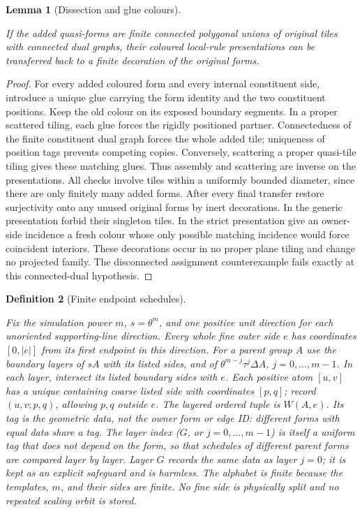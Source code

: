 \documentclass[11pt,a4paper]{article}
\newtheorem{definition}{Definition}[section]
\newtheorem{lemma}[definition]{Lemma}
\theoremstyle{remark}
\newcommand{\lean}[1]{}
\newcommand{\uses}[1]{}
\begin{document}
\begin{lemma}[Dissection and glue colours]\label{lem:glues}
\lean{Tilings.Decoration.dissection_preserves_sofic,Tilings.Planned.Strict.exists_coincident_side}
\uses{def:certificate,def:localrule}
If the added quasi-forms are finite connected polygonal unions of original
tiles with connected dual graphs, their coloured local-rule presentations
can be transferred back to a finite decoration of the original forms.
\end{lemma}
\begin{proof}
For every added coloured form and every internal constituent side,
introduce a unique glue carrying the form identity and the two constituent
positions. Keep the old colour on its exposed boundary segments.
In a proper scattered tiling, each glue forces the rigidly positioned
partner. Connectedness of the finite constituent dual graph forces the
whole added tile; uniqueness of position tags prevents competing copies.
Conversely, scattering a proper quasi-tile tiling gives these matching
glues. Thus assembly and scattering are inverse on the presentations.
All checks involve tiles within a uniformly bounded diameter, since there
are only finitely many added forms. After every final transfer restore
surjectivity onto any unused original forms by inert decorations. In the
generic presentation forbid their singleton tiles. In the strict
presentation give an owner-side incidence a fresh colour whose only possible
matching incidence would force coincident interiors. These decorations
occur in no proper plane tiling and change no projected family.
The disconnected assignment counterexample fails exactly at this
connected-dual hypothesis.
\end{proof}

\begin{definition}[Finite endpoint schedules]\label{def:endpoint-schedule}
\lean{Tilings.Alignment.EndpointSchedule}
\uses{def:certificate,def:substitution,def:sts}
Fix the simulation power $m$, $s=\theta^m$, and one positive unit direction
for each unoriented supporting-line direction. Every whole fine outer side
$e$ has coordinates $[0,|e|]$ from its first endpoint in this direction.
For a parent group $A$ use the boundary layers of $sA$ with its listed sides,
and of $\theta^{m-j}\tau^j\Delta A$, $j=0,\ldots,m-1$.
In each layer, intersect its listed boundary sides with $e$. Each positive
atom $[u,v]$ has a unique containing coarse listed side with coordinates
$[p,q]$; record $(u,v;p,q)$, allowing $p,q$ outside $e$.
The layered ordered tuple is $W(A,e)$. Its tag is the geometric data,
not the owner form or edge ID: different forms with equal data share a tag.
The layer index ($G$, or $j=0,\ldots,m-1$) is itself a uniform tag that
does not depend on the form, so that schedules of different parent forms
are compared layer by layer. Layer $G$ records the same data as layer
$j=0$; it is kept as an explicit safeguard and is harmless.
The alphabet is finite because the templates, $m$, and their sides are finite.
No fine side is physically split and no repeated scaling orbit is stored.
\end{definition}
\end{document}
